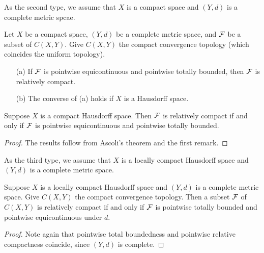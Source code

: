 As the second type, we assume that $X$ is a compact space and $(Y, d)$ is a complete metric spcae.
\begin{thm}
    Let $X$ be a compact space, $(Y, d)$ be a complete metric space, and ${\mathcal{F}}$ be a subset of $C(X, Y)$.
    Give $C(X, Y)$ the compact convergence topology (which coincides the uniform topology).
    \begin{enumerate}
        \item[(a)]
        {
            If ${\mathcal{F}}$ is pointwise equicontinuous and pointwise totally bounded, then ${\mathcal{F}}$ is relatively compact.
        }
        \item[(b)]
        {
            The converse of (a) holds if $X$ is a Hausdorff space.
        }
    \end{enumerate}
\end{thm}
\begin{rmk}
    Suppose $X$ is a compact Hausdorff space.
    Then ${\mathcal{F}}$ is relatively compact if and only if ${\mathcal{F}}$ is pointwise equicontinuous and pointwise totally bounded.
\end{rmk}
\begin{proof}
    The results follow from Ascoli's theorem and the first remark.
\end{proof}

As the third type, we assume that $X$ is a locally compact Hausdorff space and $(Y, d)$ is a complete metric space.
\begin{thm}
    Suppose $X$ is a locally compact Hausdorff space and $(Y, d)$ is a complete metric space.
    Give $C(X, Y)$ the compact convergence topology.
    Then a subset ${\mathcal{F}}$ of $C(X, Y)$ is relatively compact if and only if ${\mathcal{F}}$ is pointwise totally bounded and pointwise equicontinuous under $d$.
\end{thm}
\begin{proof}
    Note again that pointwise total boundedness and pointwise relative compactness coincide, since $(Y, d)$ is complete.
\end{proof}

